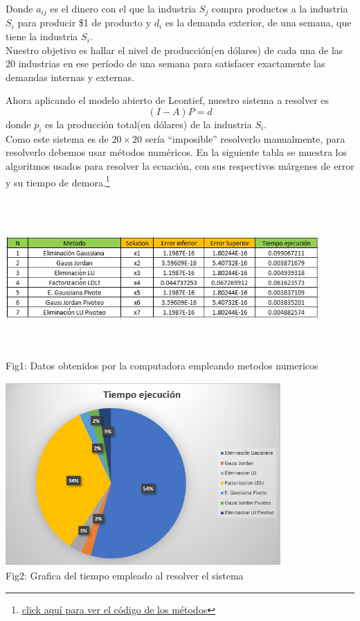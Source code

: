 \documentclass[10pt,a4paper]{article}
\begin{document}
\begin{multicols}{2}
\noindent Donde $a_{ij}$ es el dinero con el que la industria $S_j$ compra productos a la industria $S_i$ para producir \$1 de producto y $d_i$ es la demanda exterior, de una semana, que tiene la industria $S_i$.\\
Nuestro objetivo es hallar el nivel de producción(en dólares) de cada una de las 20 industrias en ese período de una semana para satisfacer exactamente las demandas internas y externas.

\noindent Ahora aplicando el modelo abierto de Leontief, nuestro sistema a resolver es $$(I-A)P=d$$ donde $p_i$ es la producción total(en dólares) de la industria $S_i$.\\
Como este sistema es de $20\times20$ sería ``imposible'' resolverlo manualmente, para resolverlo debemos usar métodos numéricos. En la siguiente tabla se muestra los algoritmos usados para resolver la ecuación, con sus respectivos márgenes de error y su tiempo de demora.\footnote{\href{https://drive.google.com/drive/folders/1F-M1slvs1ibC-nhFcPin_ge0fLCHVb1c?usp=sharing}{\underline{click aquí para ver el código de los métodos}}}
\end{multicols}
\vspace*{1cm}

\begin{center}
	\centering
	\includegraphics[width=12cm,height=6cm]{TablasDatos}
	\\
	Fig1: Datos obtenidos por la computadora empleando metodos numericos 
\end{center}

\vspace*{1cm}

\begin{center}
	\centering
	\includegraphics[width=10.5cm,height=7cm]{TiempoEjecucion.PNG}
	\\
	Fig2: Grafica del tiempo empleado al resolver el sistema
	 
\end{center}
\end{document}
